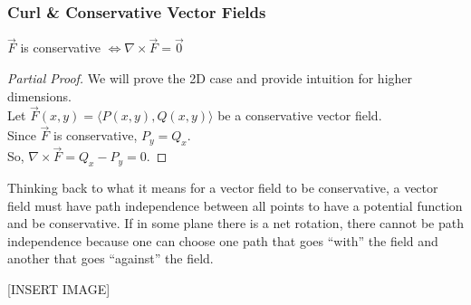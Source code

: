 \subsubsection{Curl \& Conservative Vector Fields}
\begin{theorem}
	$\vec{F}$ is conservative $\Leftrightarrow\nabla\times\vec{F} = \vec{0}$
\end{theorem}
\begin{proof}[Partial Proof]
	We will prove the 2D case and provide intuition for higher dimensions.\\
	Let $\vec{F}(x,y) = \langle P(x,y), Q(x,y)\rangle$ be a conservative vector field.\\
	Since $\vec{F}$ is conservative, $P_y = Q_x$.\\
	So, $\nabla \times \vec{F}=Q_x-P_y=0$.
\end{proof}

\noindent
Thinking back to what it means for a vector field to be conservative, a vector field must have path independence between all points to have a potential function and be conservative. If in some plane there is a net rotation, there cannot be path independence because one can choose one path that goes “with” the field and another that goes “against” the field.

[INSERT IMAGE]